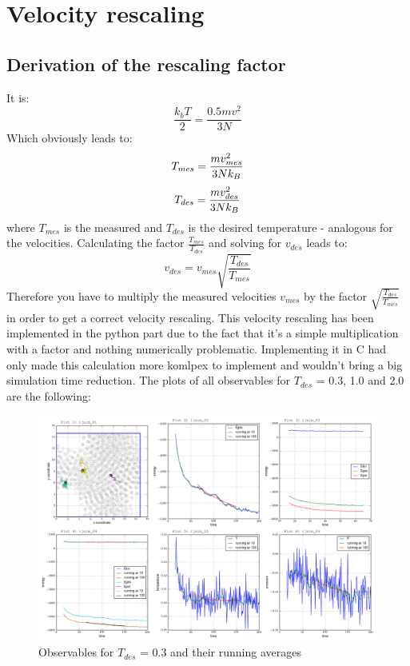 \documentclass[12pt,a4paper]{scrartcl}
\begin{document}
\section{Velocity rescaling}
 \subsection{Derivation of the rescaling factor}
 It is: 
 \begin{equation}
 \frac{k_bT}{2}=\frac{0.5mv^2}{3N}
 \end{equation}
 Which obviously leads to:
  \begin{equation}\nonumber
 T_{mes}=\frac{mv_{mes}^2}{3Nk_B} \\
 \end{equation}
\begin{equation}\nonumber
  T_{des}=\frac{mv_{des}^2}{3Nk_B} \\
\end{equation}
where $T_{mes}$ is the measured and $T_{des}$ is the desired temperature - analogous for the velocities.
Calculating the factor $\frac{T_{mes}}{T_{des}}$ and solving for $v_{des}$ leads to:
\begin{equation}
v_{des}=v_{mes} \sqrt{\frac{T_{des}}{T_{mes}}}
\end{equation}
Therefore you have to multiply the measured velocities $v_{mes}$ by the factor $\sqrt{\frac{T_{des}}{T_{mes}}}$ in order to get a correct velocity rescaling.
\newline
\newline
This velocity rescaling has been implemented in the python part due to the fact that it's a simple multiplication with a factor and nothing numerically problematic. Implementing it in C had only made this calculation more komlpex to implement and wouldn't bring a big simulation time reduction.
The plots of all observables for $T_{des}$ = 0.3, 1.0 and 2.0 are the following:
\begin{figure}[H]
\centering
\includegraphics[width=16.0cm]{../plots/Tdes03.png}
\caption{Observables for $T_{des}$ = 0.3 and their running averages}
\label{fig:running averages Tdes03}
\end{figure}
\end{document}
